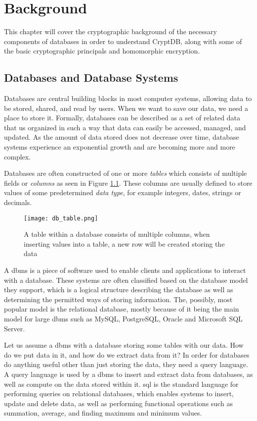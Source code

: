 \chapter{Background}
\label{chp:background}

This chapter will cover the cryptographic background of the necessary components of databases in order to understand CryptDB, along with some of the basic cryptographic principals and homomorphic encryption.

\section{Databases and Database Systems}

Databases are central building blocks in most computer systems, allowing data to be stored, shared, and read by users. When we want to save our data, we need a place to store it. Formally, databases can be described as a set of related data that us organized in such a way that data can easily be accessed, managed, and updated. As the amount of data stored does not decrease over time, database systems experience an exponential growth and are becoming more and more complex.

Databases are often constructed of one or more \emph{tables} which consists of multiple fields or \emph{columns} as seen in Figure \ref{fig:db_table}. These columns are usually defined to store values of some predetermined \emph{data type}, for example integers, dates, strings or decimals. 

\begin{figure}[h]
	\centering
	\texttt{[image: db\_table.png]}
	\caption{A table within a database consists of multiple columns, when inserting values into a table, a new row will be created storing the data}
	\label{fig:db_table}
\end{figure}

A \gls{dbms} is a piece of software used to enable clients and applications to interact with a database. These systems are often classified based on the database model they support, which is a logical structure describing the database as well as determining the permitted ways of storing information. The, possibly, most popular model is the relational database, mostly because of it being the main model for large \gls{dbms} such as MySQL, PostgreSQL, Oracle and Microsoft SQL Server.

Let us assume a \gls{dbms} with a database storing some tables with our data. How do we put data in it, and how do we extract data from it? In order for databases do anything useful other than just storing the data, they need a query language. A query language is used by a \gls{dbms} to insert and extract data from databases, as well as compute on the data stored within it. \gls{sql} is the standard language for performing queries on relational databases, which enables systems to insert, update and delete data, as well as performing functional operations such as summation, average, and finding maximum and minimum values.

